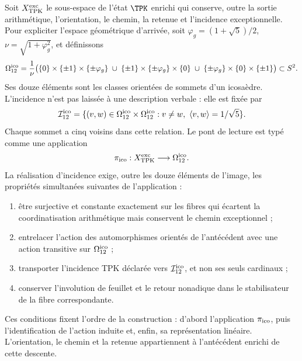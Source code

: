 Soit \(X_{\rm TPK}^{\rm exc}\) le sous-espace de l’état \(\TPK\) enrichi
qui conserve, outre la sortie arithmétique, l’orientation, le chemin,
la retenue et l’incidence exceptionnelle. Pour expliciter l’espace géométrique d’arrivée,
soit \(\varphi_g=(1+\sqrt5)/2\), \(\nu=\sqrt{1+\varphi_g^2}\), et définissons
\begin{equation}
\label{ii:pent:eq:gravity-icosahedron-vertices}
\Omega_{12}^{\rm ico}
=\frac1\nu\bigl(
\{0\}\times\{\pm1\}\times\{\pm\varphi_g\}
\;\cup\;
\{\pm1\}\times\{\pm\varphi_g\}\times\{0\}
\;\cup\;
\{\pm\varphi_g\}\times\{0\}\times\{\pm1\}
\bigr)\subset S^2.
\end{equation}
Ses douze éléments sont les classes orientées de sommets d’un icosaèdre.
L’incidence n’est pas laissée à une description verbale : elle est fixée par
\begin{equation}
\label{ii:pent:eq:gravity-icosahedron-incidence}
\mathcal I_{12}^{\rm ico}
=\{(v,w)\in\Omega_{12}^{\rm ico}\times\Omega_{12}^{\rm ico}:
v\neq w,\ \langle v,w\rangle=1/\sqrt5\}.
\end{equation}
Chaque sommet a cinq voisins dans cette relation. Le pont de lecture
est typé comme une application
\begin{equation}
\label{ii:pent:eq:gravity-exceptional-reader-map}
\pi_{\rm ico}:X_{\rm TPK}^{\rm exc}\longrightarrow\Omega_{12}^{\rm ico}.
\end{equation}
La réalisation d’incidence exige, outre les douze éléments de
l’image, les propriétés simultanées suivantes de l’application :
\begin{enumerate}[label=(\roman*)]
\item être surjective et constante exactement sur les fibres qui écartent
la coordinatisation arithmétique mais conservent le chemin exceptionnel ;
\item entrelacer l’action des automorphismes orientés de l’antécédent
avec une action transitive sur \(\Omega_{12}^{\rm ico}\) ;
\item transporter l’incidence TPK déclarée vers
\(\mathcal I_{12}^{\rm ico}\), et non
ses seuls cardinaux ;
\item conserver l’involution de feuillet et le retour nonadique dans le
stabilisateur de la fibre correspondante.
\end{enumerate}

Ces conditions fixent l’ordre de la construction : d’abord l’application
\(\pi_{\rm ico}\), puis l’identification de l’action induite et,
enfin, sa représentation linéaire. L’orientation, le chemin et la retenue
appartiennent à l’antécédent enrichi de cette descente.

